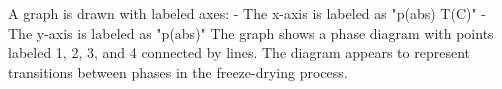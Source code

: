 A graph is drawn with labeled axes:  
- The x-axis is labeled as "p(abs) T(C)"  
- The y-axis is labeled as "p(abs)"  
The graph shows a phase diagram with points labeled 1, 2, 3, and 4 connected by lines. The diagram appears to represent transitions between phases in the freeze-drying process.